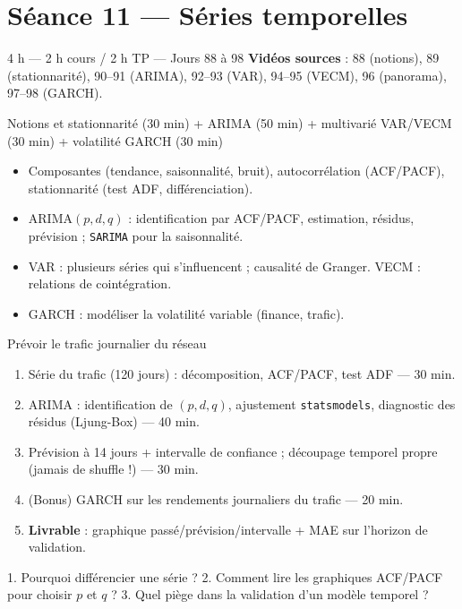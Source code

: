 \documentclass[11pt,a4paper]{article}
\begin{document}
\section*{Séance 11 — Séries temporelles}
\begin{seancebox}{4 h — 2 h cours / 2 h TP — Jours 88 à 98}
\textbf{Vidéos sources} : 88 (notions), 89 (stationnarité), 90--91 (ARIMA), 92--93 (VAR), 94--95 (VECM), 96 (panorama), 97--98 (GARCH).
\end{seancebox}
\begin{coursbox}{Notions et stationnarité (30 min) + ARIMA (50 min) + multivarié VAR/VECM (30 min) + volatilité GARCH (30 min)}
\begin{itemize}[nosep]
\item Composantes (tendance, saisonnalité, bruit), autocorrélation (ACF/PACF), stationnarité (test ADF, différenciation).
\item ARIMA$(p,d,q)$ : identification par ACF/PACF, estimation, résidus, prévision ; \texttt{SARIMA} pour la saisonnalité.
\item VAR : plusieurs séries qui s'influencent ; causalité de Granger. VECM : relations de cointégration.
\item GARCH : modéliser la volatilité variable (finance, trafic).
\end{itemize}
\end{coursbox}
\begin{tpbox}{Prévoir le trafic journalier du réseau}
\begin{enumerate}[nosep]
\item Série du trafic (120 jours) : décomposition, ACF/PACF, test ADF — 30 min.
\item ARIMA : identification de $(p,d,q)$, ajustement \texttt{statsmodels}, diagnostic des résidus (Ljung-Box) — 40 min.
\item Prévision à 14 jours + intervalle de confiance ; découpage temporel propre (jamais de shuffle !) — 30 min.
\item (Bonus) GARCH sur les rendements journaliers du trafic — 20 min.
\item \textbf{Livrable} : graphique passé/prévision/intervalle + MAE sur l'horizon de validation.
\end{enumerate}
\end{tpbox}
\begin{evalbox}
1. Pourquoi différencier une série ? 2. Comment lire les graphiques ACF/PACF pour choisir $p$ et $q$ ? 3. Quel piège dans la validation d'un modèle temporel ?
\end{evalbox}
\end{document}
